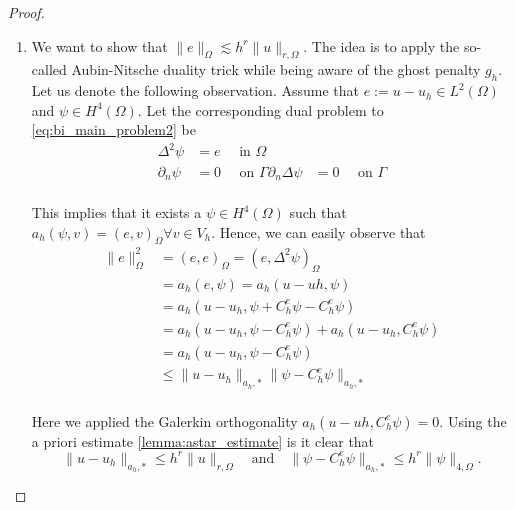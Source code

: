 \begin{proof}
\begin{enumerate}[label=\arabic*)]
    \item We want to show that $ \| e \|_{ \Omega  }^{  } \lesssim   h^{r} \| u \|_{ r,\Omega  }^{  }$. The idea is to apply the so-called Aubin-Nitsche duality trick while being aware of the ghost penalty $g_{h}$. Let us denote the following
        observation.
        Assume that $e:= u -u_{h} \in L^{2}( \Omega ) $ and $\psi  \in H^{4}( \Omega ) $.
        Let the corresponding dual problem to \eqref{eq:bi_main_problem2}  be
        \begin{equation}
            \begin{split}
            \Delta ^2 \psi &= e  \quad  \text{ in } \Omega  \\
            \partial _{n} \psi &= 0 \quad \text{ on } \Gamma
            \partial _{n} \Delta \psi & = 0 \quad  \text{ on } \Gamma   \\
            \end{split}
        \end{equation}

        This implies that it exists a $\psi \in H^{4}( \Omega ) $ such that $a_{h}( \psi, v ) = ( e,v)_{\Omega } \forall v \in V_{h}  $. Hence, we can easily observe that \begin{equation}
            \label{eq:ni_1}
            \begin{split}
        \| e \|_{ \Omega  }^{ 2 }  & = ( e,e)_\Omega   = ( e, \Delta ^2 \psi )_{\Omega } \\
        &= a_{h}( e, \psi ) = a_{h}( u-uh, \psi ) \\
        &= a_{h}( u-u_h, \psi + C^{e}_{h}\psi  - C^{e}_{h}\psi )  \\
        &= a_{h}( u-u_h, \psi   - C^{e}_{h}\psi ) +  a_{h}( u-u_h, C^{e}_{h}\psi )  \\
        &= a_{h}( u-u_h, \psi  - C^{e}_{h}\psi )  \\
        &\le   \|u-u_{h}  \|_{a_{h},*  }^{  }  \| \psi  - C^{e}_{h}\psi \|_{a_{h},*  }^{  }    \\
            \end{split}
        \end{equation}

        Here we applied the Galerkin orthogonality $ a_{h}( u-uh, C^{e}_{h}\psi ) = 0$.
        Using the a priori estimate \eqref{lemma:astar_estimate}  is it clear that
        \begin{equation}
            \label{eq:ni_2}
        \|u-u_{h}  \|_{a_{h},*  }^{  }  \le h^{r} \| u \|_{r,\Omega  }^{  }\quad  \text{and}\quad  \| \psi  - C^{e}_{h}\psi \|_{a_{h},*  }^{  }  \le h^{r} \| \psi  \|_{4, \Omega   }^{  }.
        \end{equation}


\end{enumerate}
\end{proof}
